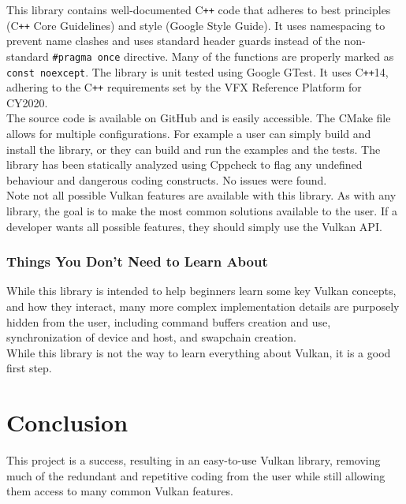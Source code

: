 \documentclass[12pt]{report}
\newcommand{\cpp}{C\texttt{++}}
\theoremstyle{definition}
\begin{document}
      This library contains well-documented \cpp{} code that adheres to best
      principles (\cpp{} Core Guidelines) and style (Google Style Guide). It
      uses namespacing to prevent name clashes and uses standard header guards
      instead of the non-standard \verb|#pragma once| directive. Many of the
      functions are properly marked as \verb!const noexcept!. The library is unit
      tested using Google GTest. It uses \cpp14, adhering to the \cpp{}
      requirements set by the VFX Reference Platform for CY2020. \\

      The source code is available on GitHub and is easily accessible. The CMake
      file allows for multiple configurations. For example a user can simply
      build and install the library, or they can build and run the examples
      and the tests. The library has been statically analyzed using Cppcheck to
      flag any undefined behaviour and dangerous coding constructs. No issues
      were found. \\

      Note not all possible Vulkan features are available with this library.
      As with any library, the goal is to make the most common solutions
      available to the user. If a developer wants all possible features,
      they should simply use the Vulkan API.

      \subsection{Things You Don't Need to Learn About}

        While this library is intended to help beginners learn some key Vulkan
        concepts, and how they interact, many more complex implementation details
        are purposely hidden from the user, including command buffers creation and
        use, synchronization of device and host, and swapchain creation. \\

        While this library is not the way to learn everything about Vulkan, it
        is a good first step.

  \chapter{Conclusion}

    This project is a success, resulting in an easy-to-use Vulkan library,
    removing much of the redundant and repetitive coding from the user
    while still allowing them access to many common Vulkan features.
\end{document}
